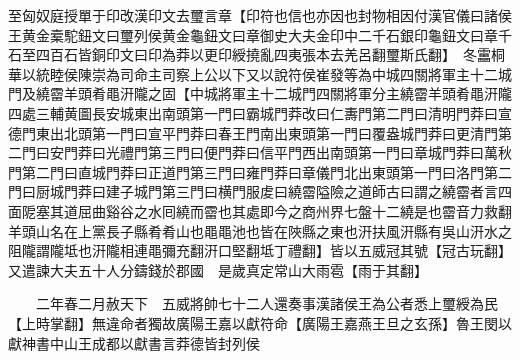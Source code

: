 至匈奴庭授單于印改漢印文去璽言章【印符也信也亦因也封物相因付漢官儀曰諸侯王黄金槖駝鈕文曰璽列侯黄金龜鈕文曰章御史大夫金印中二千石銀印龜鈕文曰章千石至四百石皆銅印文曰印為莽以更印綬撓亂四夷張本去羌呂翻璽斯氏翻】　冬靁桐華以統睦侯陳崇為司命主司察上公以下又以說符侯崔發等為中城四關將軍主十二城門及繞霤羊頭肴黽汧隴之固【中城將軍主十二城門四關將軍分主繞霤羊頭肴黽汧隴四處三輔黄圖長安城東出南頭第一門曰霸城門莽改曰仁夀門第二門曰清明門莽曰宣德門東出北頭第一門曰宣平門莽曰春王門南出東頭第一門曰覆盎城門莽曰更清門第二門曰安門莽曰光禮門第三門曰便門莽曰信平門西出南頭第一門曰章城門莽曰萬秋門第二門曰直城門莽曰正道門第三門曰雍門莽曰章儀門北出東頭第一門曰洛門第二門曰厨城門莽曰建子城門第三門曰横門服䖍曰繞霤隘險之道師古曰謂之繞霤者言四面阸塞其道屈曲谿谷之水囘繞而霤也其處即今之商州界七盤十二繞是也霤音力救翻羊頭山名在上黨長子縣肴肴山也黽黽池也皆在陜縣之東也汧扶風汧縣有吳山汧水之阻隴謂隴坻也汧隴相連黽彌充翻汧口堅翻坻丁禮翻】皆以五威冠其號【冠古玩翻】　又遣諫大夫五十人分鑄錢於郡國　是歲真定常山大雨雹【雨于其翻】

　　二年春二月赦天下　五威將帥七十二人還奏事漢諸侯王為公者悉上璽綬為民【上時掌翻】無違命者獨故廣陽王嘉以獻符命【廣陽王嘉燕王旦之玄孫】魯王閔以獻神書中山王成都以獻書言莽德皆封列侯

